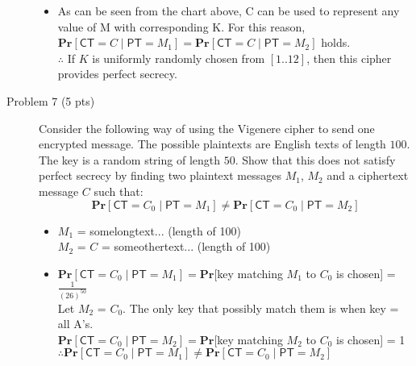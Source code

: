 \documentclass[11pt]{article}
\renewcommand{\Pr}{\ensuremath{\mathbf{Pr}}\xspace}
\newcommand{\PT}{\ensuremath{\mathsf{PT}}\xspace}
\newcommand{\CT}{\ensuremath{\mathsf{CT}}\xspace}
\begin{document}
\begin{description}
	\begin{itemize} 
	\item 
	As can be seen from the chart above, C can be used to represent any value of M with corresponding K. For this reason, $\Pr[\CT=C \mid \PT = M_1] = \Pr[\CT=C \mid \PT=M_2] $ holds. \\
	 $\therefore $ If $K$ is uniformly randomly chosen from $[1..12]$, then this cipher provides perfect secrecy.
	\end{itemize}



 \item[Problem 7 (5 pts)]
Consider the following way of using the Vigenere cipher to send one encrypted message.  The possible
plaintexts are English texts of length $100$.  The key is a random string of length $50$.  Show that
this does not satisfy perfect secrecy by finding two plaintext messages $M_1$, $M_2$ and a ciphertext message $C$
such that:
    $$\Pr[\CT=C_0 \mid \PT = M_1] \ne \Pr[\CT=C_0 \mid \PT=M_2] $$

	\begin{itemize}
	\item
	$M_1$ = somelongtext... (length of 100) \\
	$M_2$ = $C$ = someothertext... (length of 100)\\
	\item
	$\Pr[\CT=C_0 \mid \PT = M_1] = \Pr$[key matching $M_1$ to $C_0$ is chosen] = $\frac{1}{(26)^{50}} $\\
	Let $M_2$ = $C_0$. The only key that possibly match them is when key = all A's.\\
	$\Pr[\CT=C_0 \mid \PT = M_2] = \Pr$[key matching $M_2$ to $C_0$ is chosen] = 1\\
	$\therefore \Pr[\CT=C_0 \mid \PT = M_1] \ne \Pr[\CT=C_0 \mid \PT=M_2] $ \\
	\end{itemize}
%



\end{description}
\end{document}
